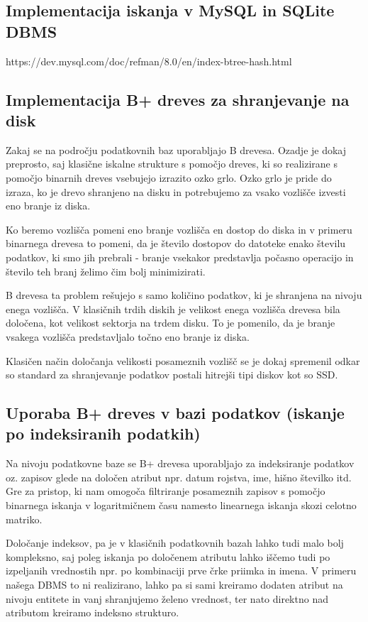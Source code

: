 \documentclass[a4paper,12pt,openright]{book}
\begin{document}
        \subsection{Implementacija iskanja v MySQL in SQLite DBMS}
        \colorbox{BurntOrange}{https://dev.mysql.com/doc/refman/8.0/en/index-btree-hash.html}

        \subsection{Implementacija B+ dreves za shranjevanje na disk}
        Zakaj se na področju podatkovnih baz uporabljajo B drevesa. Ozadje je dokaj preprosto, saj klasične iskalne strukture s pomočjo dreves, ki so realizirane s pomočjo binarnih dreves vsebujejo izrazito ozko grlo. Ozko grlo je pride do izraza, ko je drevo shranjeno na disku in potrebujemo za vsako vozlišče izvesti eno branje iz diska.

        Ko beremo vozlišča pomeni eno branje vozlišča en dostop do diska in v primeru binarnega drevesa to pomeni, da je število dostopov do datoteke enako številu podatkov, ki smo jih prebrali - branje vsekakor predstavlja počasno operacijo in število teh branj želimo čim bolj minimizirati.

        B drevesa ta problem rešujejo s samo količino podatkov, ki je shranjena na nivoju enega vozlišča. V klasičnih trdih diskih je velikost enega vozlišča drevesa bila določena, kot velikost sektorja na trdem disku. To je pomenilo, da je branje vsakega vozlišča predstavljalo točno eno branje iz diska.

        Klasičen način določanja velikosti posameznih vozlišč se je dokaj spremenil odkar so standard za shranjevanje podatkov postali hitrejši tipi diskov kot so SSD.
        
        \subsection{Uporaba B+ dreves v bazi podatkov (iskanje po indeksiranih podatkih)}
        Na nivoju podatkovne baze se B+ drevesa uporabljajo za indeksiranje podatkov oz. zapisov glede na določen atribut npr. datum rojstva, ime, hišno številko itd. Gre za pristop, ki nam omogoča filtriranje posameznih zapisov s pomočjo binarnega iskanja v logaritmičnem času namesto linearnega iskanja skozi celotno matriko.
        
        Določanje indeksov, pa je v klasičnih podatkovnih bazah lahko tudi malo bolj kompleksno, saj poleg iskanja po določenem atributu lahko iščemo tudi po izpeljanih vrednostih npr. po kombinaciji prve črke priimka in imena. V primeru našega DBMS to ni realizirano, lahko pa si sami kreiramo dodaten atribut na nivoju entitete in vanj shranjujemo želeno vrednost, ter nato direktno nad atributom kreiramo indeksno strukturo.
        
\end{document}

